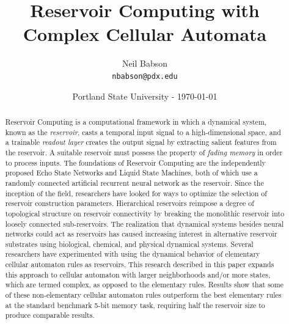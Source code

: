 \documentclass{facconf}
\title{Reservoir Computing with Complex Cellular Automata}
\author{Neil Babson\\ \texttt{nbabson@pdx.edu}}
\date{Portland State University -  \today}
\begin{document}
\maketitle


\begin{abstract}
Reservoir Computing is a computational framework in which a dynamical system, 
          known as the \textit{reservoir}, casts a temporal input signal to a 
          high-dimensional space, and a trainable \textit{readout layer} 
          creates the output signal by extracting salient features from the 
          reservoir.
A suitable reservoir  must possess the property of 
\textit{fading memory} in order to process inputs. The foundations of Reservoir Computing are the 
independently proposed Echo State Networks and Liquid State Machines, both of 
which use a randomly connected artificial recurrent neural network as the 
reservoir. Since the inception of the field, researchers have looked for ways 
to optimize the selection of reservoir construction parameters. Hierarchical 
reservoirs reimpose a degree of topological structure on reservoir connectivity 
by breaking the monolithic reservoir into loosely connected sub-reservoirs. The 
realization that dynamical systems besides neural networks could act as 
reservoirs has caused increasing interest in alternative reservoir substrates 
using biological, chemical, and physical dynamical systems. Several researchers 
have experimented with using the dynamical behavior of elementary cellular 
automaton rules as reservoirs. This research described in this paper expands 
this approach to cellular automaton with larger neighborhoods and/or more 
states, which are termed complex, as opposed to the elementary rules. Results 
show that some of these non-elementary cellular automaton rules outperform the 
best elementary rules at the standard benchmark 5-bit memory task, requiring 
half the reservoir size to produce comparable results.
\end{abstract}
\end{document}
